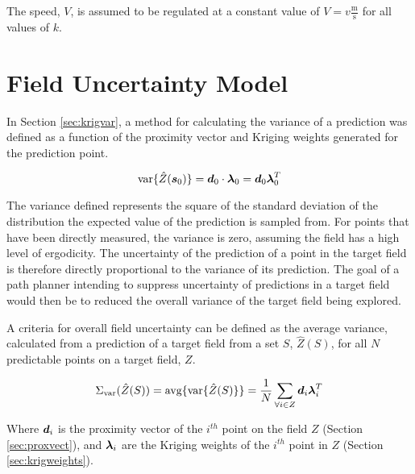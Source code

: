 The speed, $V$, is assumed to be regulated at a constant value of $V = v \frac{\text{m}}{\text{s}}$ for all values of $k$.

\section{Field Uncertainty Model} \label{sec:fielduncert}
In Section \ref{sec:krigvar}, a method for calculating the variance of a prediction was defined as a function of the proximity vector and Kriging weights generated for the prediction point.

\begin{equation}
    \text{var}\{\hat{Z}({\it{\boldsymbol{s}}}_0)\} = {\it{\boldsymbol{d}}}_0 \cdot {\it{\boldsymbol{\lambda}}}_0 = {\it{\boldsymbol{d}}}_0 {\it{\boldsymbol{\lambda}}}_0^T
\end{equation}

The variance defined represents the square of the standard deviation of the distribution the expected value of the prediction is sampled from. For points that have been directly measured, the variance is zero, assuming the field has a high level of ergodicity. The uncertainty of the prediction of a point in the target field is therefore directly proportional to the variance of its prediction. The goal of a path planner intending to suppress uncertainty of predictions in a target field would then be to reduced the overall variance of the target field being explored.

A criteria for overall field uncertainty can be defined as the average variance, calculated from a prediction of a target field from a set $S$, $\hat{Z}(S)$, for all $N$ predictable points on a target field, $Z$.

\begin{equation}
	\Sigma_{\text{var}}(\hat{Z}(S)) = \text{avg}\{{\text{var}\{\hat{Z}(S)\}}\} = \frac{1}{N}\sum_{\forall i \in Z} {\it{\boldsymbol{d}}}_i {\it{\boldsymbol{\lambda}}}_i^T
	\label{eq:fielduncert}
\end{equation}

Where ${\it{\boldsymbol{d}}}_i$ is the proximity vector of the $i^{th}$ point on the field $Z$ (Section \ref{sec:proxvect}), and ${\it{\boldsymbol{\lambda}}}_i$ are the Kriging weights of the $i^{th}$ point in $Z$ (Section \ref{sec:krigweights}).